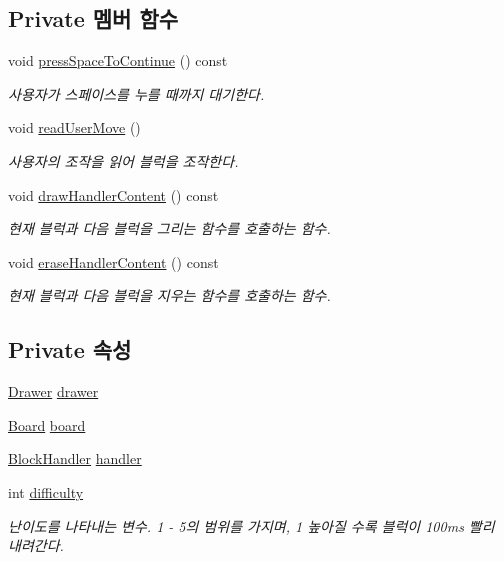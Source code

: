 \subsection*{Private 멤버 함수}
\begin{DoxyCompactItemize}
\item 
void \mbox{\hyperlink{class_game_a00e70c3fa536c8b76e92aaca66c5ccc2}{press\+Space\+To\+Continue}} () const
\begin{DoxyCompactList}\small\item\em 사용자가 스페이스를 누를 때까지 대기한다. \end{DoxyCompactList}\item 
void \mbox{\hyperlink{class_game_aeb128045605ef167c233da9f993d407d}{read\+User\+Move}} ()
\begin{DoxyCompactList}\small\item\em 사용자의 조작을 읽어 블럭을 조작한다. \end{DoxyCompactList}\item 
void \mbox{\hyperlink{class_game_aa61075838d60bc5c850b72bc4804b7b8}{draw\+Handler\+Content}} () const
\begin{DoxyCompactList}\small\item\em 현재 블럭과 다음 블럭을 그리는 함수를 호출하는 함수. \end{DoxyCompactList}\item 
void \mbox{\hyperlink{class_game_a7ab3d17dc7bf72f0a59fbb7b17c6ce5a}{erase\+Handler\+Content}} () const
\begin{DoxyCompactList}\small\item\em 현재 블럭과 다음 블럭을 지우는 함수를 호출하는 함수. \end{DoxyCompactList}\end{DoxyCompactItemize}
\subsection*{Private 속성}
\begin{DoxyCompactItemize}
\item 
\mbox{\hyperlink{class_drawer}{Drawer}} \mbox{\hyperlink{class_game_a045e1468514c0c0d51e968364e0678ad}{drawer}}
\item 
\mbox{\hyperlink{class_board}{Board}} \mbox{\hyperlink{class_game_af5bc546b0c766ecf2f7e008f750832ed}{board}}
\item 
\mbox{\hyperlink{class_block_handler}{Block\+Handler}} \mbox{\hyperlink{class_game_ae72b7259125e83dfd258c6a132394eec}{handler}}
\item 
int \mbox{\hyperlink{class_game_a536a6390d16f05d402928bd731e06ef3}{difficulty}}
\begin{DoxyCompactList}\small\item\em 난이도를 나타내는 변수. 1 -\/ 5의 범위를 가지며, 1 높아질 수록 블럭이 100ms 빨리 내려간다. \end{DoxyCompactList}\end{DoxyCompactItemize}


